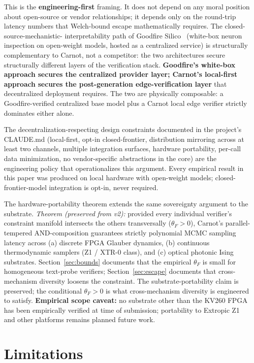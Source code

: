 \documentclass[10pt]{article}
\begin{document}
This is the \textbf{engineering-first} framing. It does not depend
on any moral position about open-source or vendor relationships;
it depends only on the round-trip latency numbers that Welch-bound
escape mathematically requires. The closed-source-mechanistic-
interpretability path of Goodfire Silico~\cite{goodfire2026}
(white-box neuron inspection on open-weight models, hosted as a
centralized service) is structurally complementary to Carnot, not
a competitor: the two architectures secure structurally different
layers of the verification stack. \textbf{Goodfire's white-box
approach secures the centralized provider layer; Carnot's
local-first approach secures the post-generation edge-verification
layer} that decentralized deployment requires. The two are
physically composable: a Goodfire-verified centralized base model
plus a Carnot local edge verifier strictly dominates either alone.

The decentralization-respecting design constraints documented in
the project's CLAUDE.md (local-first, opt-in closed-frontier,
distribution mirroring across at least two channels, multiple
integration surfaces, hardware portability, per-call data
minimization, no vendor-specific abstractions in the core) are the
engineering policy that operationalizes this argument. Every
empirical result in this paper was produced on local hardware with
open-weight models; closed-frontier-model integration is opt-in,
never required.

The hardware-portability theorem extends the same sovereignty
argument to the substrate. \emph{Theorem (preserved from v2):}
provided every individual verifier's constraint manifold intersects
the others transversally ($\theta_F > 0$), Carnot's parallel-tempered
AND-composition guarantees strictly polynomial MCMC sampling
latency across (a) discrete FPGA Glauber dynamics, (b) continuous
thermodynamic samplers (Z1 / XTR-0 class), and (c) optical photonic
Ising substrates. Section~\ref{sec:bounds} documents that the
empirical $\theta_F$ is small for homogeneous text-probe verifiers;
Section~\ref{sec:escape} documents that cross-mechanism diversity
loosens the constraint. The substrate-portability claim is
preserved; the conditional $\theta_F > 0$ is what cross-mechanism
diversity is engineered to satisfy. \textbf{Empirical scope caveat:}
no substrate other than the KV260 FPGA has been empirically verified
at time of submission; portability to Extropic Z1 and other
platforms remains planned future work.

\section{Limitations}
\label{sec:limitations}
\end{document}
